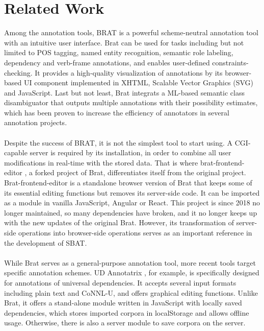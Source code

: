 \documentclass[12ptm a4paper]{article}
\begin{document}
\section{Related Work}
Among the annotation tools, BRAT \citep{stenetorp-etal-2012-brat} is a powerful scheme-neutral annotation tool with an intuitive user interface. Brat can be used for tasks including but not limited to POS tagging, named entity recognition, semantic role labeling, dependency and verb-frame annotations, and enables user-defined constraints-checking. It provides a high-quality visualization of annotations by its browser-based UI component implemented in XHTML, Scalable Vector Graphics (SVG) and JavaScript. Last but not least, Brat integrats a ML-based semantic class disambiguator that outputs multiple annotations with their possibility estimates, which has been proven to increase the efficiency of annotators in several annotation projects.\\
\\
Despite the success of BRAT, it is not the simplest tool to start using. A CGI-capable server is required by its installation, in order to combine all user modifications in real-time with the stored data. That is where brat-frontend-editor \citep{brat-frontend-editor}, a forked project of Brat, differentiates itself from the original project. Brat-frontend-editor is a standalone browser version of Brat that keeps some of its essential editing functions but removes its server-side code. It can be imported as a module in vanilla JavaScript, Angular or React. This project is since 2018 no longer maintained, so many dependencies have broken, and it no longer keeps up with the new updates of the original Brat. However, its transformation of server-side operations into browser-side operations serves as an important reference in the development of SBAT.\\
\\
While Brat serves as a general-purpose annotation tool, more recent tools target specific annotation schemes. UD Annotatrix \citep{tyers-etal-2017-ud}, for example, is specifically designed for annotations of universal dependencies. It accepts several input formats including plain text and CoNNL-U, and offers graphical editing functions. Unlike Brat, it offers a stand-alone module written in JavaScript with locally saved dependencies, which stores imported corpora in localStorage and allows offline usage. Otherwise, there is also a server module to save corpora on the server.\\
\\
\end{document}
